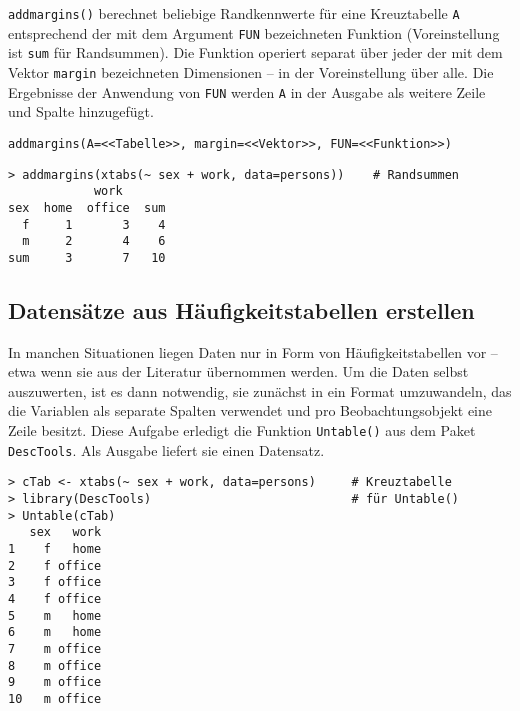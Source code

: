 \lstinline!addmargins()! berechnet beliebige Randkennwerte für eine Kreuztabelle \lstinline!A! entsprechend der mit dem Argument \lstinline!FUN! bezeichneten Funktion (Voreinstellung ist \lstinline!sum! für Randsummen). Die Funktion operiert separat über jeder der mit dem Vektor \lstinline!margin! bezeichneten Dimensionen -- in der Voreinstellung über alle. Die Ergebnisse der Anwendung von \lstinline!FUN! werden \lstinline!A! in der Ausgabe als weitere Zeile und Spalte hinzugefügt.
\begin{lstlisting}
addmargins(A=<<Tabelle>>, margin=<<Vektor>>, FUN=<<Funktion>>)
\end{lstlisting}

\begin{lstlisting}
> addmargins(xtabs(~ sex + work, data=persons))    # Randsummen
            work
sex  home  office  sum
  f     1       3    4
  m     2       4    6
sum     3       7   10
\end{lstlisting}

\subsection{Datensätze aus Häufigkeitstabellen erstellen}
\label{sec:tab2df}

In manchen Situationen liegen Daten nur in Form von Häufigkeitstabellen vor -- etwa wenn sie aus der Literatur übernommen werden. Um die Daten selbst auszuwerten, ist es dann notwendig, sie zunächst in ein Format umzuwandeln, das die Variablen als separate Spalten verwendet und pro Beobachtungsobjekt eine Zeile besitzt. Diese Aufgabe erledigt die Funktion \lstinline!Untable()! aus dem Paket  \lstinline!DescTools!. Als Ausgabe liefert sie einen Datensatz.
\begin{lstlisting}
> cTab <- xtabs(~ sex + work, data=persons)     # Kreuztabelle
> library(DescTools)                            # für Untable()
> Untable(cTab)
   sex   work
1    f   home
2    f office
3    f office
4    f office
5    m   home
6    m   home
7    m office
8    m office
9    m office
10   m office
\end{lstlisting}

